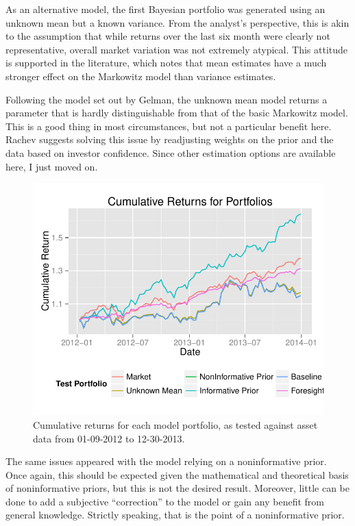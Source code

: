 \documentclass[a4paper]{article}\usepackage[]{graphicx}\usepackage[]{color}
\makeatletter
\def\maxwidth{ %
  \ifdim\Gin@nat@width>\linewidth
    \linewidth
  \else
    \Gin@nat@width
  \fi
}
\newenvironment{knitrout}{}{} %
\makeatother
\begin{document}
As an alternative model, the first Bayesian portfolio was generated using an unknown mean but a known variance. From the analyst's perspective, this is akin to the assumption that while returns over the last six month were clearly not representative, overall market variation was not extremely atypical. This attitude is supported in the literature, which notes that mean estimates have a much stronger effect on the Markowitz model than variance estimates.

Following the model set out by Gelman, \cite{gelman13} the unknown mean model returns a parameter that is hardly distinguishable from that of the basic Markowitz model. This is a good thing in most circumstances, but not a particular benefit here. Rachev suggests solving this issue by readjusting weights on the prior and the data based on investor confidence. \cite{rachev08} Since other estimation options are available here, I just moved on.

\begin{figure}[t]
    \centering
\begin{knitrout}
\color{fgcolor}
\includegraphics[width=\maxwidth]{figure/results-1} 

\end{knitrout}
    \caption{Cumulative returns for each model portfolio, as tested against asset data from 01-09-2012 to 12-30-2013.}
    \label{fig:cumret}
\end{figure}

The same issues appeared with the model relying on a noninformative prior. Once again, this should be expected given the mathematical and theoretical basis of noninformative priors, but this is not the desired result. Moreover, little can be done to add a subjective ``correction'' to the model or gain any benefit from general knowledge. Strictly speaking, that is the point of a noninformative prior. 
\end{document}

